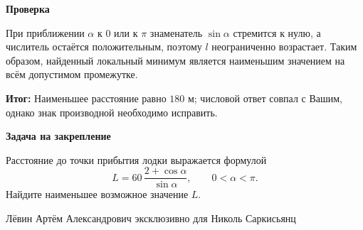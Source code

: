 \documentclass[11pt,a4paper]{article}
\newcommand{\conclusion}[1]{\par\textcolor{teal!60!black}{\textbf{Итог:}} #1\par}
\newcommand{\itemhead}[1]{\par\medskip\textbf{#1}\par}
\begin{document}
\itemhead{Проверка}
При приближении $\alpha$ к $0$ или к $\pi$ знаменатель $\sin\alpha$ стремится к нулю, а числитель остаётся положительным, поэтому $l$ неограниченно возрастает. Таким образом, найденный локальный минимум является наименьшим значением на всём допустимом промежутке.
\conclusion{Наименьшее расстояние равно $180$ м; числовой ответ совпал с Вашим, однако знак производной необходимо исправить.}
\itemhead{Задача на закрепление}
Расстояние до точки прибытия лодки выражается формулой
\[
L=60\,\frac{2+\cos\alpha}{\sin\alpha},
\qquad 0<\alpha<\pi.
\]
Найдите наименьшее возможное значение $L$.

\vfill
\begin{center}\small Лёвин Артём Александрович эксклюзивно для Николь Саркисьянц\end{center}
\end{document}
